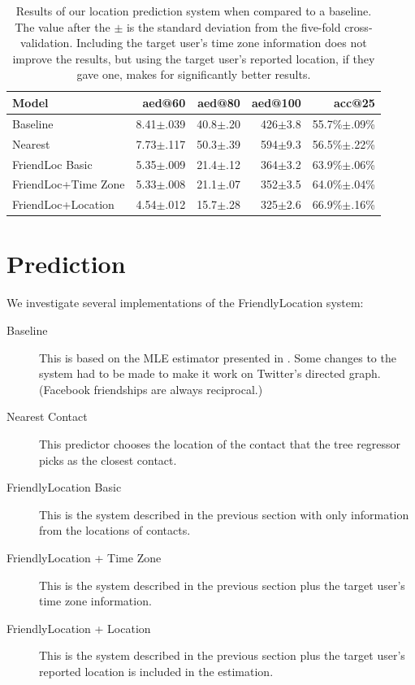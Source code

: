 \begin{table}[tb]
\centering
\begin{tabular}{l  r r r r}
    Model & aed@60 & aed@80 & aed@100 & acc@25 \\
    \hline
    Baseline & 8.41$\pm$.039 & 40.8$\pm$.20 & 426$\pm$3.8 & 55.7\%$\pm$.09\% \\
    Nearest & 7.73$\pm$.117 & 50.3$\pm$.39 & 594$\pm$9.3 & 56.5\%$\pm$.22\% \\
    FriendLoc Basic & 5.35$\pm$.009 & 21.4$\pm$.12 & 364$\pm$3.2 & 63.9\%$\pm$.06\% \\
    FriendLoc+Time Zone & 5.33$\pm$.008 & 21.1$\pm$.07 & 352$\pm$3.5 & 64.0\%$\pm$.04\% \\
    FriendLoc+Location & 4.54$\pm$.012 & 15.7$\pm$.28 & 325$\pm$2.6 & 66.9\%$\pm$.16\% \\
\end{tabular}
\caption{
    Results of our location prediction system when compared to a baseline.
    The value after the $\pm$ is the standard deviation from the five-fold
    cross-validation.
    Including the target user's time zone information does not improve the
    results, but using the target user's reported location, if they gave one,
    makes for significantly better results.
}
\label{tab:results}
\end{table}

\section{Prediction}
We investigate several implementations of the FriendlyLocation system:
\begin{description}
\item[Baseline] This is based on the MLE estimator presented in
    \cite{backstrom2010find}. Some changes to the system had to be made to make it
    work on Twitter's directed graph. (Facebook friendships are always
    reciprocal.)
\item[Nearest Contact] This predictor chooses the location of the contact that
    the tree regressor picks as the closest contact.
\item[FriendlyLocation Basic] This is the system described in the previous
    section with only information from the locations of contacts.
\item[FriendlyLocation + Time Zone] This is the system described in the previous
    section plus the target user's time zone information.
\item[FriendlyLocation + Location] This is the system described in the previous
    section plus the target user's reported location is included in the
    estimation.
\end{description}

